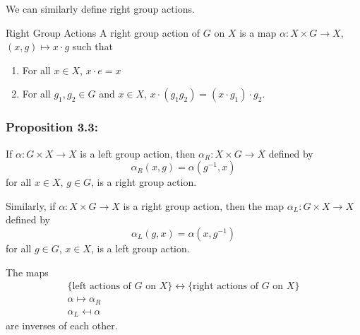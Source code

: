 \documentclass{article}
\begin{document}
We can similarly define right group actions.
\begin{definition}{Right Group Actions}
    A right group action of $G$ on $X$ is a map $\alpha: X \times G \rightarrow X$, $(x,g)\mapsto x\cdot g$ such that
    \begin{enumerate}
        \item For all $x\in X$, $x\cdot e=x$
        \item For all $g_1,g_2\in G$ and $x\in X$, $x\cdot (g_1g_2) = (x\cdot g_1)\cdot g_2$.
    \end{enumerate}
\end{definition}
\subsubsection{Proposition 3.3:}
\begin{idea}
    If $\alpha: G\times X\rightarrow X$ is a left group action, then $\alpha_R: X\times G \rightarrow X$ defined by
    \begin{equation*}
        \alpha_R(x,g)=\alpha(g^{-1},x)
    \end{equation*}
    for all $x\in X$, $g\in G$, is a right group action.
    \vspace{2mm}

    Similarly, if $\alpha: X\times G\rightarrow X$ is a right group action, then the map $\alpha_L : G\times X\rightarrow X$ defined by
    \begin{equation*}
        \alpha_L(g,x)=\alpha(x,g^{-1})
    \end{equation*}
    for all $g\in G$, $x\in X$, is a left group action.
    \vspace{2mm}

    The maps 
    \begin{align*}
        \{\text{left actions of $G$ on $X$}\} \leftrightarrow \{\text{right actions of $G$ on $X$}\} \\ 
        \alpha \mapsto \alpha_R \\ 
        \alpha_L \mapsfrom \alpha
    \end{align*}
    are inverses of each other.
\end{idea}
\end{document}
